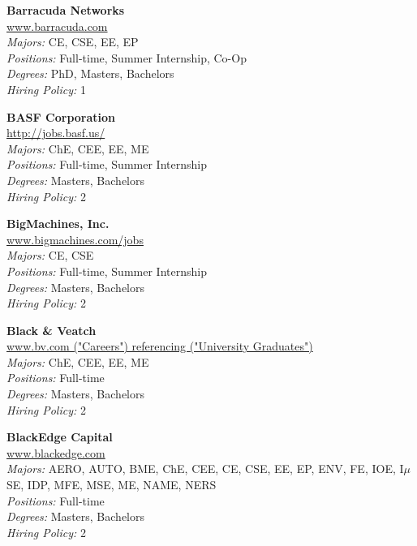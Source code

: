 \documentclass[twoside]{article}
\begin{document}
\begin{center}
\begin{multicols}{3}
\begin{minipage}{.9\columnwidth}{\Large\bf Barracuda Networks }\\
	\url{www.barracuda.com}\\
	\emph{Majors:} CE, CSE, EE, EP\\
	\emph{Positions:} Full-time, Summer Internship, Co-Op\\
	\emph{Degrees:} PhD, Masters, Bachelors\\
	\emph{Hiring Policy:} 1\\
\end{minipage}
 
\begin{minipage}{.9\columnwidth}{\Large\bf BASF Corporation }\\
	\url{http://jobs.basf.us/}\\
	\emph{Majors:} ChE, CEE, EE, ME\\
	\emph{Positions:} Full-time, Summer Internship\\
	\emph{Degrees:} Masters, Bachelors\\
	\emph{Hiring Policy:} 2\\
\end{minipage}
 
\begin{minipage}{.9\columnwidth}{\Large\bf BigMachines, Inc. }\\
	\url{www.bigmachines.com/jobs}\\
	\emph{Majors:} CE, CSE\\
	\emph{Positions:} Full-time, Summer Internship\\
	\emph{Degrees:} Masters, Bachelors\\
	\emph{Hiring Policy:} 2\\
\end{minipage}
 
\begin{minipage}{.9\columnwidth}{\Large\bf Black \& Veatch }\\
	\url{www.bv.com ("Careers") referencing ("University Graduates")}\\
	\emph{Majors:} ChE, CEE, EE, ME\\
	\emph{Positions:} Full-time\\
	\emph{Degrees:} Masters, Bachelors\\
	\emph{Hiring Policy:} 2\\
\end{minipage}
 
\begin{minipage}{.9\columnwidth}{\Large\bf BlackEdge Capital }\\
	\url{www.blackedge.com}\\
	\emph{Majors:} AERO, AUTO, BME, ChE, CEE, CE, CSE, EE, EP, ENV, FE, IOE, I$\mu$SE, IDP, MFE, MSE, ME, NAME, NERS\\
	\emph{Positions:} Full-time\\
	\emph{Degrees:} Masters, Bachelors\\
	\emph{Hiring Policy:} 2\\
\end{minipage}
 

\end{multicols}
\end{center}
\end{document}
